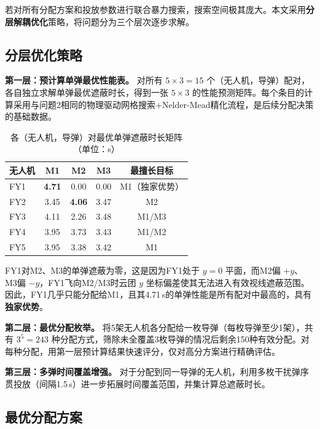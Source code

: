 \documentclass[12pt, a4paper]{article}
\begin{document}
若对所有分配方案和投放参数进行联合暴力搜索，搜索空间极其庞大。本文采用\textbf{分层解耦优化}策略，将问题分为三个层次逐步求解。

\subsection{分层优化策略}

\textbf{第一层：预计算单弹最优性能表。}
对所有 $5\times3=15$ 个（无人机，导弹）配对，各自独立求解单弹最优遮蔽时长，得到一张 $5\times3$ 的性能预测矩阵。每个条目的计算采用与问题2相同的物理驱动网格搜索+Nelder-Mead精化流程，是后续分配决策的基础数据。

\begin{table}[H]
\centering
\caption{各（无人机，导弹）对最优单弹遮蔽时长矩阵（单位：s）}
\label{tab:single}
\begin{tabular}{lcccc}
\toprule
无人机 & M1 & M2 & M3 & 最擅长目标 \\
\midrule
FY1 & \textbf{4.71} & 0.00 & 0.00 & M1（独家优势） \\
FY2 & 3.45 & \textbf{4.06} & 3.47 & M2 \\
FY3 & 4.11 & 2.26 & 3.48 & M1/M3 \\
FY4 & 3.95 & 3.73 & 3.43 & M1/M2 \\
FY5 & 3.95 & 3.38 & 3.42 & M1 \\
\bottomrule
\end{tabular}
\end{table}

FY1对M2、M3的单弹遮蔽为零，这是因为FY1处于 $y=0$ 平面，而M2偏 $+y$、M3偏 $-y$，FY1飞向M2/M3时云团 $y$ 坐标偏差使其无法进入有效视线遮蔽范围。因此，FY1几乎只能分配给M1，且其4.71\,s的单弹性能是所有配对中最高的，具有\textbf{独家优势}。

\textbf{第二层：最优分配枚举。}
将5架无人机各分配给一枚导弹（每枚导弹至少1架），共有 $3^5=243$ 种分配方式，筛除未全覆盖3枚导弹的情况后剩余150种有效分配。对每种分配，用第一层预计算结果快速评分，仅对高分方案进行精确评估。

\textbf{第三层：多弹时间覆盖增强。}
对于分配到同一导弹的无人机，利用多枚干扰弹序贯投放（间隔1.5\,s）进一步拓展时间覆盖范围，并集计算总遮蔽时长。

\subsection{最优分配方案}
\end{document}
